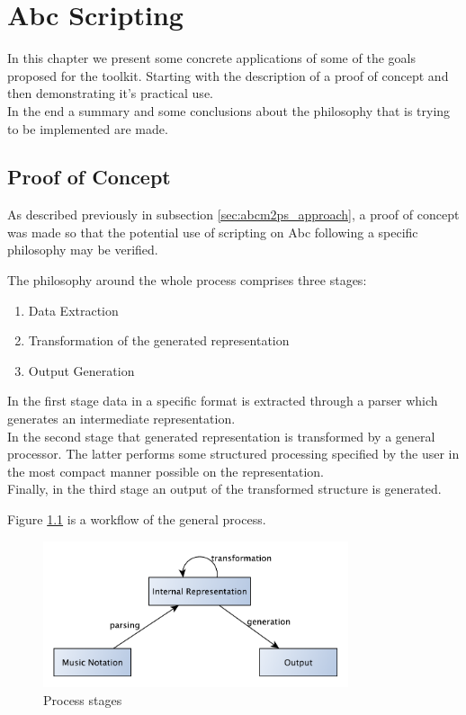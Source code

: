 \documentclass[main.tex]{subfiles}
\begin{document}
\chapter{Abc Scripting}
\label{chap:scripting_abc}
In this chapter we present some concrete applications of some of the goals proposed for the toolkit.
Starting with the description of a proof of concept and then demonstrating it's practical use.\\
In the end a summary and some conclusions about the philosophy that is trying to be implemented
are made.

\section{Proof of Concept}

As described previously in subsection \ref{sec:abcm2ps_approach}, a proof of concept was made so
that the potential use of scripting on Abc following a specific philosophy may be verified.

The philosophy around the whole process comprises three stages:
\begin{enumerate}
  \item Data Extraction
  \item Transformation of the generated representation
  \item Output Generation
\end{enumerate}

In the first stage data in a specific format is extracted through a parser which generates an
intermediate representation.\\
In the second stage that generated representation is transformed by a general processor. The latter
performs some structured processing specified by the user in the most compact manner possible on the
representation.\\
Finally, in the third stage an output of the transformed structure is generated.

Figure \ref{fig:process_stages} is a workflow of the general process.

\begin{figure}[htb]
  \centering 
  \includegraphics[width=0.8\textwidth]{img/proof_of_concept_general.pdf} 
  \caption{Process stages}
  \label{fig:process_stages}
\end{figure}
\end{document}
